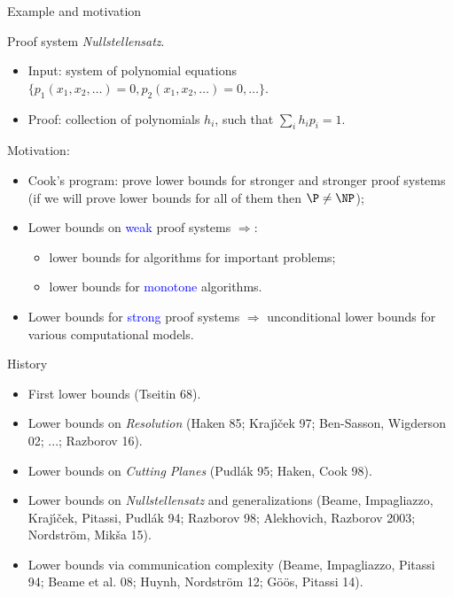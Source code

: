 \begin{frame}{Example and motivation}

    Proof system \textit{Nullstellensatz}.
    \begin{itemize}
        \item Input: system of polynomial equations $\{p_1(x_1, x_2, \dots) = 0, p_2(x_1, x_2, \dots) =
            0, \dots\}$.
            \pause
        \item Proof: collection of polynomials $h_i$, such that $\sum\limits_{i} h_i p_i = 1$.
    \end{itemize}

    Motivation:
    \begin{itemize}
        \item Cook's program: prove lower bounds for stronger and stronger proof systems (if we will
            prove lower bounds for all of them then $\P \neq \NP$);
        \pause
        \item Lower bounds on \textcolor{blue}{weak} proof systems
            $\Rightarrow$:
            \begin{itemize}
                \item lower bounds for algorithms for important problems;
                \item lower bounds for \textcolor{blue}{monotone} algorithms.
            \end{itemize}
        \pause
        \item Lower bounds for \textcolor{blue}{strong} proof systems $\Rightarrow$ unconditional lower
            bounds for various computational models.
    \end{itemize}

\end{frame}


\begin{frame}{History}

    \begin{itemize}
        \item First lower bounds (Tseitin 68).
        \pause
        \item Lower bounds on \textit{Resolution} (Haken 85; Kraj{\'{\i}}{\v{c}}ek 97; Ben-Sasson, Wigderson 02; ...;
            Razborov 16).
        \pause
        \item Lower bounds on \textit{Cutting Planes} (Pudl{\'{a}}k 95; Haken, Cook 98).
        \item Lower bounds on \textit{Nullstellensatz} and generalizations (Beame, Impagliazzo,
            Kraj{\'{\i}}{\v{c}}ek, Pitassi, Pudl{\'{a}}k 94; Razborov 98; Alekhovich, Razborov 2003;
            Nordstr{\"{o}}m, Mik{\v{s}}a 15).
        \pause
        \item Lower bounds via communication complexity (Beame, Impagliazzo,
            Pitassi 94; Beame et al. 08; Huynh, Nordstr{\"{o}}m 12; G{\"{o}}{\"{o}}s, Pitassi 14).
    \end{itemize}

\end{frame}

